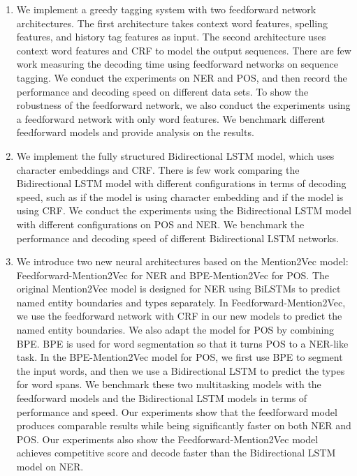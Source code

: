\documentclass{sfuthesis}
\begin{document}
\begin{enumerate}

\item We implement a greedy tagging system with two feedforward network architectures. The first architecture takes context word features, spelling features, and history tag features as input. The second architecture uses context word features and CRF to model the output sequences. There are few work measuring the decoding time using feedforward networks on sequence tagging. We conduct the experiments on NER and POS, and then record the performance and decoding speed on different data sets. To show the robustness of the feedforward network, we also conduct the experiments using a feedforward network with only word features. We benchmark different feedforward models and provide analysis on the results. 

\item We implement the fully structured Bidirectional LSTM model, which uses character embeddings and CRF. There is few work comparing the Bidirectional LSTM model with different configurations in terms of decoding speed, such as if the model is using character embedding and if the model is using CRF. We conduct the experiments using the Bidirectional LSTM model with different configurations on POS and NER. We benchmark the performance and decoding speed of different Bidirectional LSTM networks. 

\item We introduce two new neural architectures based on the Mention2Vec model: Feedforward-Mention2Vec for NER and BPE-Mention2Vec for POS. The original Mention2Vec model is designed for NER using BiLSTMs to predict named entity boundaries and types separately. In Feedforward-Mention2Vec, we use the feedforward network with CRF in our new models to predict the named entity boundaries. We also adapt the model for POS by combining BPE. BPE is used for word segmentation so that it turns POS to a NER-like task. In the BPE-Mention2Vec model for POS, we first use BPE to segment the input words, and then we use a Bidirectional LSTM to predict the types for word spans. We benchmark these two multitasking models with the feedforward models and the Bidirectional LSTM models in terms of performance and speed. Our experiments show that the feedforward model produces comparable results while being significantly faster on both NER and POS. Our experiments also show the Feedforward-Mention2Vec model achieves competitive score and decode faster than the Bidirectional LSTM model on NER.

\end{enumerate}
\end{document}
